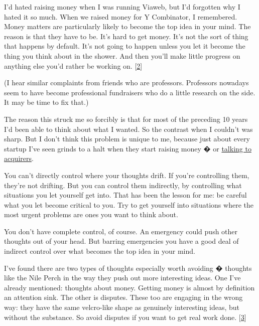 I'd hated raising
                    money when I was running Viaweb, but I'd forgotten why I
                    hated it so much. When we raised money for Y Combinator, I
                    remembered. Money matters are particularly likely to become
                    the top idea in your mind. The reason is that they have to
                    be. It's hard to get money. It's not the sort of thing that
                    happens by default. It's not going to happen unless you let
                    it become the thing you think about in the shower. And then
                    you'll make little progress on anything else you'd rather be
                    working on.
                    [\href{\#f2n}{2}]

(I hear similar complaints from friends who are
                    professors. Professors nowadays seem to have become
                    professional fundraisers who do a little research on the
                    side. It may be time to fix that.)

The reason
                    this struck me so forcibly is that for most of the preceding
                    10 years I'd been able to think about what I wanted. So the
                    contrast when I couldn't was sharp. But I don't think this
                    problem is unique to me, because just about every startup
                    I've seen grinds to a halt when they start raising money �
                    or
                    \href{http://www.paulgraham.com/corpdev.html}{talking to acquirers}.

You can't directly control where your thoughts
                    drift. If you're controlling them, they're not drifting. But
                    you can control them indirectly, by controlling what
                    situations you let yourself get into. That has been the
                    lesson for me: be careful what you let become critical to
                    you. Try to get yourself into situations where the most
                    urgent problems are ones you want to think about.

You
                    don't have complete control, of course. An emergency could
                    push other thoughts out of your head. But barring
                    emergencies you have a good deal of indirect control over
                    what becomes the top idea in your mind.

I've
                    found there are two types of thoughts especially worth
                    avoiding � thoughts like the Nile Perch in the way they push
                    out more interesting ideas. One I've already mentioned:
                    thoughts about money. Getting money is almost by definition
                    an attention sink. The other is disputes. These too are
                    engaging in the wrong way: they have the same velcro-like
                    shape as genuinely interesting ideas, but without the
                    substance. So avoid disputes if you want to get real work
                    done.
                    [\href{\#f3n}{3}]

